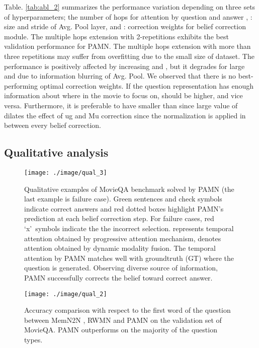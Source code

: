 \documentclass[10pt,twocolumn,letterpaper]{article}
\begin{document}
Table. \ref{tab:abl_2} summarizes the performance variation depending on three sets of hyperparameters; the number of hops for attention by question  and answer , : size and stride of Avg. Pool layer, and : correction weights for belief correction module. The multiple hops extension with 2-repetitions exhibits the best validation performance for PAMN. The multiple hops extension with more than three repetitions may suffer from overfitting due to the small size of dataset. The performance is positively affected by increasing  and , but it degrades for large  and  due to information blurring of Avg. Pool. 
We observed that there is no best-performing optimal correction weights. If the question representation  has enough information about where in the movie to focus on,  should be higher, and vice versa. Furthermore, it is preferable to have smaller  than  since large value of  dilates the effect of ug and Mu correction since the normalization is applied in between every belief correction. 

\subsection{Qualitative analysis}
\label{ssec:4.6}


\begin{figure*}[t!]
	\begin{center}
		\texttt{[image: ./image/qual\_3]}
		\caption{Qualitative examples of MovieQA benchmark solved by PAMN (the last example is failure case). Green sentences and check symbols indicate correct answers and red dotted boxes highlight PAMN's prediction at each belief correction step. For failure cases, red \textquoteleft x\textquoteright\ symbols indicate the the incorrect selection.  represents temporal attention obtained by progressive attention mechanism,  denotes attention obtained by dynamic modality fusion. The temporal attention by PAMN matches well with groundtruth (GT) where the question is generated. Observing diverse source of information, PAMN successfully corrects the belief toward correct answer.}
		\label{fig:qual}
	\end{center}
\end{figure*}
\begin{figure}[h!]
	\begin{center}
		\texttt{[image: ./image/qual\_2]}
		\caption{Accuracy comparison with respect to the first word of the question between MemN2N \cite{MovieQA}, RWMN \cite{rwmn} and PAMN on the validation set of MovieQA. PAMN outperforms on the majority of the question types.}
		\label{fig:qual_2}
	\end{center}
\end{figure}
\end{document}

